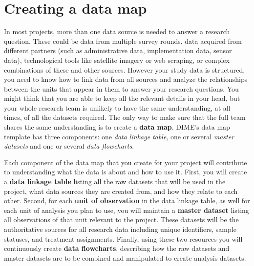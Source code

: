 
\section{Creating a data map}

In most projects, more than one data source is needed to answer a research question.
These could be data from multiple survey rounds,
data acquired from different partners 
(such as administrative data, implementation data, sensor data),
technological tools like satellite imagery or web scraping,
or complex combinations of these and other sources.
However your study data is structured, 
you need to know how to link data from all sources
and analyze the relationships between the units that appear in them
to answer your research questions.
You might think that you are able to keep all the relevant details in your head,
but your whole research team is unlikely to have the same understanding,
at all times, of all the datasets required.
The only way to make sure that the full team shares the same understanding
is to create a \textbf{data map}.
DIME's data map template has three components:
one \textit{data linkage table},
one or several \textit{master datasets}
and one or several \textit{data flowcharts}.

Each component of the data map
that you create for your project
will contribute to understanding
what the data is about and how to use it.
First, you will create a \textbf{data linkage table}
listing all the raw datasets that will be used in the project,
what data sources they are created from,
and how they relate to each other.
Second, for each \textbf{unit of observation} 
in the data linkage table,
as well for each unit of analysis you plan to use,
you will maintain a \textbf{master dataset}
listing all observations of that unit relevant to the project.
These datasets will be the authoritative sources for all research data
including unique identifiers, sample statuses, and treatment assignments.
Finally, using these two resources
you will continuously create \textbf{data flowcharts},
describing how the raw datasets and master datasets 
are to be combined and manipulated to create analysis datasets.

